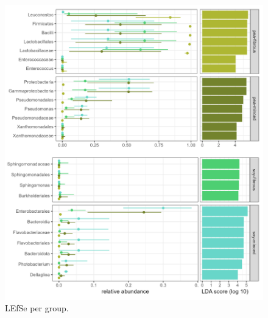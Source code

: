 \documentclass[preprint,3p,
a4paper]{elsarticle} %
\begin{document}
\begin{figure}

{\centering \includegraphics[width=1\linewidth]{lefsestatplotdiffscales} 

}

\caption{\label{figSM4} LEfSe per group.  }\label{fig:figSM4}
\end{figure}
\end{document}
